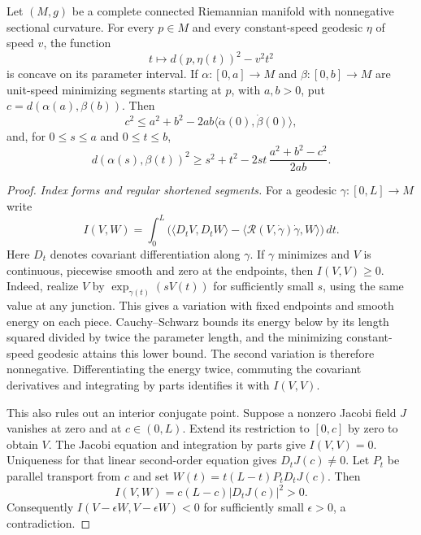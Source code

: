 \begin{lemma}
\label{lem:rf-squared-distance-comparison}
Let $(M,g)$ be a complete connected Riemannian manifold with
nonnegative sectional curvature.  For every $p\in M$ and every
constant-speed geodesic $\eta$ of speed $v$, the function
\[
                  t\longmapsto d(p,\eta(t))^2-v^2t^2
\]
is concave on its parameter interval.
If $\alpha:[0,a]\to M$ and $\beta:[0,b]\to M$ are unit-speed
minimizing segments starting at $p$, with $a,b>0$, put
$c=d(\alpha(a),\beta(b))$.  Then
\[
 c^2\leq a^2+b^2-2ab
              \langle\dot\alpha(0),\dot\beta(0)\rangle,
\]
and, for $0\leq s\leq a$ and $0\leq t\leq b$,
\[
 d(\alpha(s),\beta(t))^2
 \geq s^2+t^2-2st\,\frac{a^2+b^2-c^2}{2ab}.
\]
\end{lemma}
\begin{proof}
\emph{Index forms and regular shortened segments.}
For a geodesic $\gamma:[0,L]\to M$ write
\[
 I(V,W)=\int_0^L
 \bigl(\langle D_tV,D_tW\rangle
       -\langle\mathcal R(V,\dot\gamma)\dot\gamma,W\rangle\bigr)\,dt.
\]
Here $D_t$ denotes covariant differentiation along $\gamma$.
If $\gamma$ minimizes and $V$ is continuous, piecewise smooth
and zero at the endpoints, then $I(V,V)\geq0$.  Indeed, realize
$V$ by $\exp_{\gamma(t)}(sV(t))$ for sufficiently small $s$,
using the same value at any junction.  This gives a variation
with fixed endpoints and smooth energy on each piece.
Cauchy--Schwarz bounds its energy below by its length squared
divided by twice the parameter length, and the minimizing
constant-speed geodesic attains this lower bound.  The second
variation is therefore nonnegative.  Differentiating the energy
twice, commuting the covariant derivatives and integrating by
parts identifies it with $I(V,V)$.

This also rules out an interior conjugate point.  Suppose a
nonzero Jacobi field $J$ vanishes at zero and at $c\in(0,L)$.
Extend its restriction to $[0,c]$ by zero to obtain $V$.
The Jacobi equation and integration by parts give $I(V,V)=0$.
Uniqueness for that linear second-order equation gives
$D_tJ(c)\ne0$.  Let $P_t$ be parallel transport from $c$ and
set $W(t)=t(L-t)P_tD_tJ(c)$.  Then
\[
 I(V,W)=c(L-c)|D_tJ(c)|^2>0.
\]
Consequently $I(V-\epsilon W,V-\epsilon W)<0$ for sufficiently
small $\epsilon>0$, a contradiction.


\end{proof}
